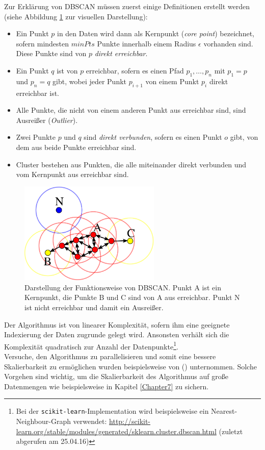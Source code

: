 Zur Erklärung von DBSCAN müssen zuerst einige Definitionen erstellt werden (siehe Abbildung \ref{fig:dbscan} zur visuellen
Darstellung):
\begin{itemize}
  \item Ein Punkt $p$ in den Daten wird dann als
  Kernpunkt (\emph{core point}) bezeichnet, sofern mindesten $minPts$ Punkte innerhalb einem Radius $\epsilon$ vorhanden sind.\\
  Diese Punkte sind von $p$ \emph{direkt erreichbar}.
  \item Ein Punkt $q$ ist von $p$ erreichbar, sofern es einen Pfad $p_1, \ldots, p_n$ mit $p_1 = p$ und $p_n = q$ gibt, wobei
  jeder Punkt $p_{i+1}$ von einem Punkt $p_i$ direkt erreichbar ist.
  \item Alle Punkte, die nicht von einem anderen Punkt aus erreichbar sind, sind Ausreißer (\emph{Outlier}).
  \item Zwei Punkte $p$ und $q$ sind \emph{direkt verbunden}, sofern es einen Punkt $o$ gibt,
  von dem aus beide Punkte erreichbar sind.
  \item Cluster bestehen aus Punkten, die alle miteinander direkt verbunden und vom Kernpunkt aus erreichbar sind.
\end{itemize}

\begin{figure}[h]
  \centering
  \includegraphics[width=0.6\textwidth]{../img/DBSCAN-Illustration.png}
  \caption[Darstellung der Funktionsweise von DBSCAN]{Darstellung der Funktionsweise von DBSCAN. Punkt A ist ein Kernpunkt, die
  Punkte B und C sind von A aus erreichbar. Punkt N ist nicht erreichbar und damit ein Ausreißer.\label{fig:dbscan}\footnotemark}
\end{figure}

Der Algorithmus ist von linearer Komplexität, sofern ihm eine geeignete Indexierung der Daten zugrunde gelegt wird. Ansonsten
verhält sich die Komplexität quadratisch zur Anzahl der Datenpunkte\footnote{Bei der
\verb|scikit-learn|-Implementation wird beispielsweise ein Nearest-Neighbour-Graph verwendet:
\url{http://scikit-learn.org/stable/modules/generated/sklearn.cluster.dbscan.html} (zuletzt abgerufen am 25.04.16)}.\\

Versuche, den Algorithmus zu parallelisieren und somit eine bessere Skalierbarkeit zu ermöglichen wurden beispielsweise von
(\cite{arlia2001experiments}) unternommen. Solche Vorgehen sind wichtig, um die Skalierbarkeit des Algorithmus auf große
Datenmengen wie beispielsweise in Kapitel \ref{Chapter7} zu sichern.
